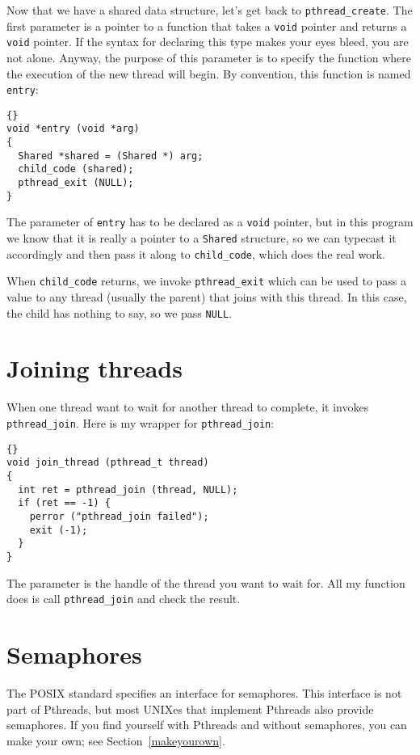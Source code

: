 \documentclass{book}
\begin{document}
Now that we have a shared data structure, let's get back to
{\tt pthread\_create}.
The first parameter is a pointer to a function that takes
a {\tt void} pointer and returns a {\tt void} pointer.  If the syntax
for declaring this type makes your eyes bleed, you are not alone.
Anyway, the purpose of this parameter is to specify the function where
the execution of the new thread will begin.  By convention, this
function is named {\tt entry}:

\begin{lstlisting}[title={}]{}
void *entry (void *arg)
{
  Shared *shared = (Shared *) arg;
  child_code (shared);
  pthread_exit (NULL);
}
\end{lstlisting}

The parameter of {\tt entry} has to be declared as a {\tt void}
pointer, but in this program we know that it is really a pointer to a
{\tt Shared} structure, so we can typecast it accordingly and then
pass it along to {\tt child\_code}, which does the real work.

When {\tt child\_code} returns, we invoke {\tt pthread\_exit}
which can be used to pass a value to any thread (usually the
parent) that joins with this thread.  In this case, the child
has nothing to say, so we pass {\tt NULL}.


\section{Joining threads}

When one thread want to wait for another thread to complete,
it invokes {\tt pthread\_join}.
Here is my wrapper for {\tt pthread\_join}:

\begin{lstlisting}[title={}]{}
void join_thread (pthread_t thread)
{
  int ret = pthread_join (thread, NULL);
  if (ret == -1) {
    perror ("pthread_join failed");
    exit (-1);
  }
}
\end{lstlisting}

The parameter is the handle of the thread you want to wait for.
All my function does is call {\tt pthread\_join} and check the
result.


\section{Semaphores}

The POSIX standard specifies an interface for semaphores.
This interface is not part of Pthreads, but most UNIXes
that implement Pthreads also provide semaphores.  If you
find yourself with Pthreads and without semaphores, you
can make your own; see Section~\ref{makeyourown}.
\end{document}

